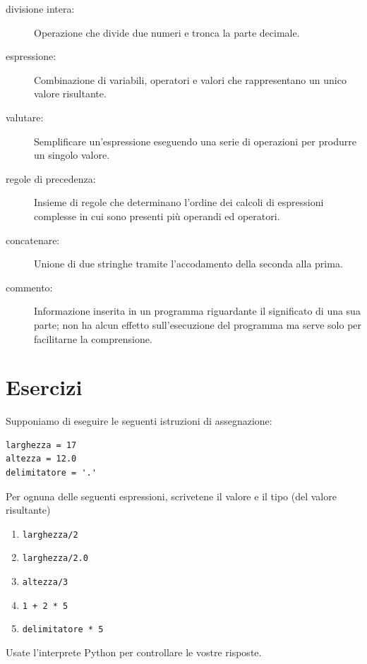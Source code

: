 \documentclass[10pt]{book}
\begin{document}
\begin{description}
\item[divisione intera:] Operazione che divide due numeri e tronca la parte decimale.

\item[espressione:]  Combinazione di variabili, operatori e valori che rappresentano un unico valore risultante.

\item[valutare:]  Semplificare un'espressione eseguendo una serie di operazioni per produrre un singolo valore.

\item[regole di precedenza:]  Insieme di regole che determinano l'ordine dei calcoli di espressioni complesse in cui sono presenti più operandi ed operatori.

\item[concatenare:]  Unione di due stringhe tramite l'accodamento della seconda alla prima.

\item[commento:]  Informazione inserita in un programma riguardante il significato di una sua parte; non ha alcun effetto sull'esecuzione del programma
ma serve solo per facilitarne la comprensione.

\end{description}


\section{Esercizi}

\begin{exercise}

Supponiamo di eseguire le seguenti istruzioni di assegnazione:

\begin{verbatim}
larghezza = 17
altezza = 12.0
delimitatore = '.'
\end{verbatim}

Per ognuna delle seguenti espressioni, scrivetene il valore e il tipo (del valore risultante)

\begin{enumerate}

\item {\tt larghezza/2}

\item {\tt larghezza/2.0}

\item {\tt altezza/3}

\item {\tt 1 + 2 * 5}

\item {\tt delimitatore * 5}

\end{enumerate}

Usate l'interprete Python per controllare le vostre risposte.
\end{exercise}
\end{document}
